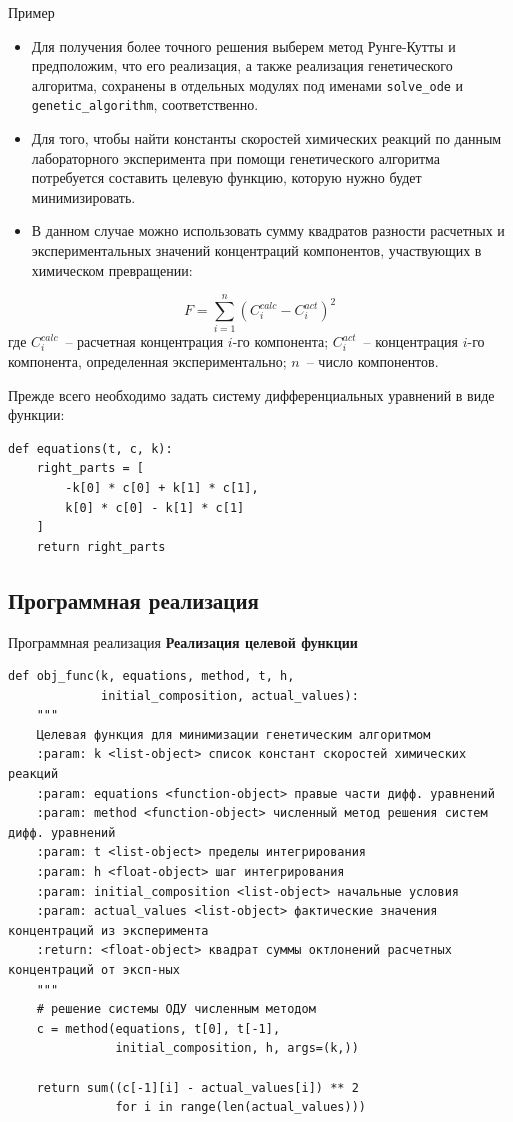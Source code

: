 \documentclass[aspectratio=169, mathserif]{beamer}	%
\begin{document}
\begin{frame}[fragile]{Пример}
\scriptsize
\begin{itemize}
	\item Для получения более точного решения выберем метод Рунге-Кутты и предположим, что его реализация, а также реализация генетического алгоритма, сохранены в отдельных модулях под именами \texttt{solve\_ode} и  \texttt{genetic\_algorithm}, соответственно.
	\item Для того, чтобы найти константы скоростей химических реакций по данным лабораторного эксперимента при помощи генетического алгоритма потребуется составить целевую функцию, которую нужно будет минимизировать.
	\item В данном случае можно использовать сумму квадратов разности расчетных и экспериментальных значений концентраций компонентов, участвующих в химическом превращении:
\end{itemize}
\vfill
\begin{equation*}
	F = \sum\limits_{i=1}^{n}\left(C_i^{calc}-C_i^{act}\right)^2
\end{equation*}
\noindent где $C_i^{calc}$~-- расчетная концентрация $i$-го компонента; $C_i^{act}$~-- концентрация $i$-го компонента, определенная экспериментально; $n$~-- число компонентов.

Прежде всего необходимо задать систему дифференциальных уравнений в виде функции:
\vfill
\begin{verbatim}
def equations(t, c, k):
    right_parts = [
        -k[0] * c[0] + k[1] * c[1],
        k[0] * c[0] - k[1] * c[1]
    ]
    return right_parts
\end{verbatim}
\vfill
\end{frame}


\subsection{Программная реализация}
\begin{frame}[fragile]{Программная реализация}
\scriptsize
\alert{\textbf{Реализация целевой функции}}
\begin{verbatim}
def obj_func(k, equations, method, t, h,
             initial_composition, actual_values):
    """
    Целевая функция для минимизации генетическим алгоритмом
    :param: k <list-object> список констант скоростей химических реакций
    :param: equations <function-object> правые части дифф. уравнений
    :param: method <function-object> численный метод решения систем дифф. уравнений
    :param: t <list-object> пределы интегрирования
    :param: h <float-object> шаг интегрирования
    :param: initial_composition <list-object> начальные условия
    :param: actual_values <list-object> фактические значения концентраций из эксперимента
    :return: <float-object> квадрат суммы октлонений расчетных концентраций от эксп-ных
    """
    # решение системы ОДУ численным методом
    c = method(equations, t[0], t[-1],
               initial_composition, h, args=(k,))

    return sum((c[-1][i] - actual_values[i]) ** 2
               for i in range(len(actual_values)))
\end{verbatim}
\vfill
\end{frame}
\end{document}
